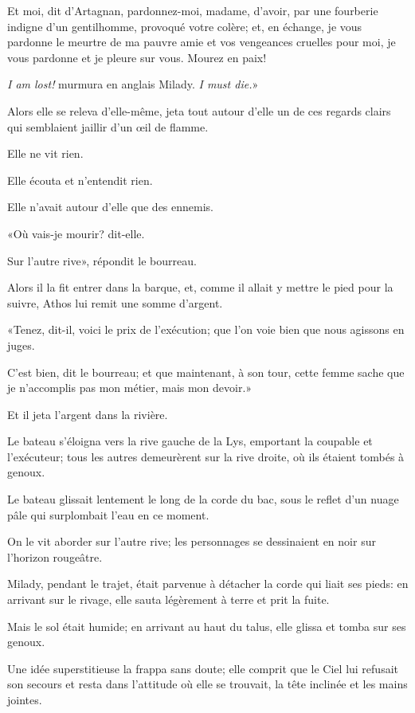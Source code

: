 \speak  Et moi, dit d'Artagnan, pardonnez-moi, madame, d'avoir, par une fourberie indigne d'un gentilhomme, provoqué votre colère; et, en échange, je vous pardonne le meurtre de ma pauvre amie et vos vengeances cruelles pour moi, je vous pardonne et je pleure sur vous. Mourez en paix! 

\speak  \textit{I am lost!} murmura en anglais Milady. \textit{I must die.}» 

Alors elle se releva d'elle-même, jeta tout autour d'elle un de ces regards clairs qui semblaient jaillir d'un œil de flamme. 

Elle ne vit rien. 

Elle écouta et n'entendit rien. 

Elle n'avait autour d'elle que des ennemis. 

«Où vais-je mourir? dit-elle. 

\speak  Sur l'autre rive», répondit le bourreau. 

Alors il la fit entrer dans la barque, et, comme il allait y mettre le pied pour la suivre, Athos lui remit une somme d'argent. 

«Tenez, dit-il, voici le prix de l'exécution; que l'on voie bien que nous agissons en juges. 

\speak  C'est bien, dit le bourreau; et que maintenant, à son tour, cette femme sache que je n'accomplis pas mon métier, mais mon devoir.» 

Et il jeta l'argent dans la rivière. 

Le bateau s'éloigna vers la rive gauche de la Lys, emportant la coupable et l'exécuteur; tous les autres demeurèrent sur la rive droite, où ils étaient tombés à genoux. 

Le bateau glissait lentement le long de la corde du bac, sous le reflet d'un nuage pâle qui surplombait l'eau en ce moment. 

On le vit aborder sur l'autre rive; les personnages se dessinaient en noir sur l'horizon rougeâtre. 

Milady, pendant le trajet, était parvenue à détacher la corde qui liait ses pieds: en arrivant sur le rivage, elle sauta légèrement à terre et prit la fuite. 

Mais le sol était humide; en arrivant au haut du talus, elle glissa et tomba sur ses genoux. 

Une idée superstitieuse la frappa sans doute; elle comprit que le Ciel lui refusait son secours et resta dans l'attitude où elle se trouvait, la tête inclinée et les mains jointes. 

